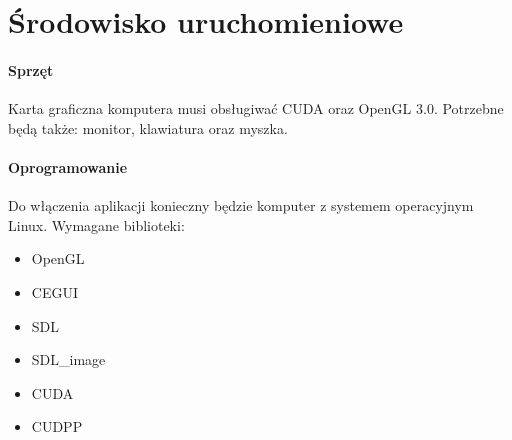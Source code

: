 \section{Środowisko uruchomieniowe}

\paragraph{Sprzęt}
Karta graficzna komputera musi obsługiwać CUDA oraz OpenGL 3.0. Potrzebne będą także: monitor, klawiatura oraz myszka.

\paragraph{Oprogramowanie}
Do włączenia aplikacji konieczny będzie komputer z systemem operacyjnym Linux. Wymagane biblioteki: 
\begin{itemize}
\item{OpenGL}
\item{CEGUI}
\item{SDL}
\item{SDL\_image}
\item{CUDA}
\item{CUDPP}
\end{itemize}


